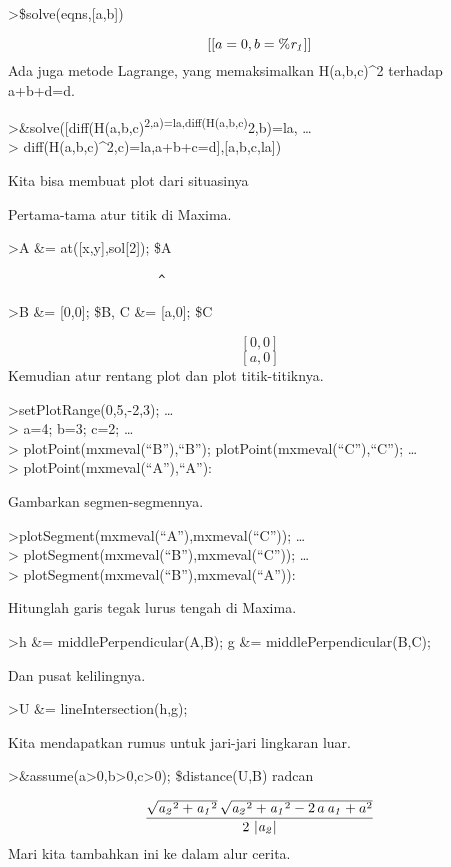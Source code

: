 \documentclass[
]{book}
\begin{document}
\textgreater\$solve(eqns,{[}a,b{]})

\[\left[ \left[ a=0 , b={\it \%r_1} \right]  \right]\]Ada juga metode Lagrange, yang memaksimalkan H(a,b,c)\^{}2 terhadap a+b+d=d.

\textgreater\&solve({[}diff(H(a,b,c)\textsuperscript{2,a)=la,diff(H(a,b,c)}2,b)=la, \ldots{}\\
\textgreater{} diff(H(a,b,c)\^{}2,c)=la,a+b+c=d{]},{[}a,b,c,la{]})

Kita bisa membuat plot dari situasinya

Pertama-tama atur titik di Maxima.

\textgreater A \&= at({[}x,y{]},sol{[}2{]}); \$A

\begin{verbatim}
                     ^
\end{verbatim}

\textgreater B \&= {[}0,0{]}; \$B, C \&= {[}a,0{]}; \$C

\[\left[ 0 , 0 \right]\] \[\left[ a , 0 \right]\]Kemudian atur rentang plot dan plot titik-titiknya.

\textgreater setPlotRange(0,5,-2,3); \ldots{}\\
\textgreater{} a=4; b=3; c=2; \ldots{}\\
\textgreater{} plotPoint(mxmeval(``B''),``B''); plotPoint(mxmeval(``C''),``C''); \ldots{}\\
\textgreater{} plotPoint(mxmeval(``A''),``A''):

Gambarkan segmen-segmennya.

\textgreater plotSegment(mxmeval(``A''),mxmeval(``C'')); \ldots{}\\
\textgreater{} plotSegment(mxmeval(``B''),mxmeval(``C'')); \ldots{}\\
\textgreater{} plotSegment(mxmeval(``B''),mxmeval(``A'')):

Hitunglah garis tegak lurus tengah di Maxima.

\textgreater h \&= middlePerpendicular(A,B); g \&= middlePerpendicular(B,C);

Dan pusat kelilingnya.

\textgreater U \&= lineIntersection(h,g);

Kita mendapatkan rumus untuk jari-jari lingkaran luar.

\textgreater\&assume(a\textgreater0,b\textgreater0,c\textgreater0); \$distance(U,B) \textbar{} radcan

\[\frac{\sqrt{{\it a_2}^2+{\it a_1}^2}\,\sqrt{{\it a_2}^2+{\it a_1}^2-2\,a\,{\it a_1}+a^2}}{2\,\left| {\it a_2}\right| }\]Mari kita tambahkan ini ke dalam alur cerita.
\end{document}
